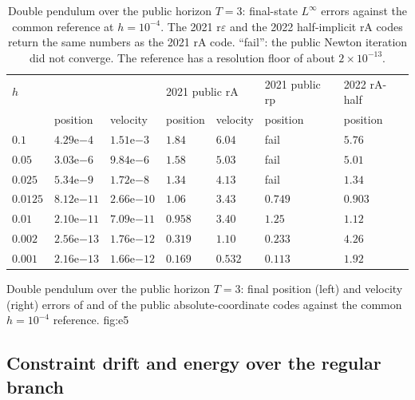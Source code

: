 \begin{table}[!htb]
\centering
\caption{Double pendulum over the public horizon $T=3$: final-state $L^\infty$ errors against the
common \method{} reference at $h=10^{-4}$. The 2021 r$\varepsilon$ and the 2022 half-implicit rA
codes return the same numbers as the 2021 rA code. ``fail'': the public Newton iteration did not
converge. The reference has a resolution floor of about $2\times10^{-13}$.}
\label{tab:e5}
\scriptsize
\setlength{\tabcolsep}{3.5pt}
\begin{tabular}{@{}lllllll@{}}
\toprule
$h$ & \multicolumn{2}{l}{\method{}} & \multicolumn{2}{l}{2021 public rA} & 2021 public rp & 2022 rA-half \\
    & position & velocity & position & velocity & position & position \\
\midrule
$0.1$    & $4.29\mathrm{e}{-4}$  & $1.51\mathrm{e}{-3}$  & $1.84$ & $6.04$ & fail   & $5.76$ \\
$0.05$   & $3.03\mathrm{e}{-6}$  & $9.84\mathrm{e}{-6}$  & $1.58$ & $5.03$ & fail   & $5.01$ \\
$0.025$  & $5.34\mathrm{e}{-9}$  & $1.72\mathrm{e}{-8}$  & $1.34$ & $4.13$ & fail   & $1.34$ \\
$0.0125$ & $8.12\mathrm{e}{-11}$ & $2.66\mathrm{e}{-10}$ & $1.06$ & $3.43$ & $0.749$ & $0.903$ \\
$0.01$   & $2.10\mathrm{e}{-11}$ & $7.09\mathrm{e}{-11}$ & $0.958$ & $3.40$ & $1.25$ & $1.12$ \\
$0.002$  & $2.56\mathrm{e}{-13}$ & $1.76\mathrm{e}{-12}$ & $0.319$ & $1.10$ & $0.233$ & $4.26$ \\
$0.001$  & $2.16\mathrm{e}{-13}$ & $1.66\mathrm{e}{-12}$ & $0.169$ & $0.532$ & $0.113$ & $1.92$ \\
\bottomrule
\end{tabular}
\end{table}

{Double pendulum over the public horizon $T=3$: final position (left) and velocity (right) errors
of \method{} and of the public absolute-coordinate codes against the common $h=10^{-4}$ reference.}
{fig:e5}


\subsection{Constraint drift and energy over the regular branch}
\label{sec:e6}

